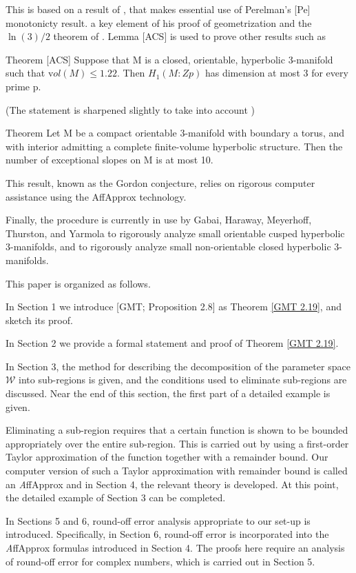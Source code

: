 This is based on a result of \cite{ADST},
that makes essential use of Perelman's [Pe] monotonicty result.
a key element of his proof of geometrization and the $\ln(3)/2$
theorem of \cite{GMT}.
Lemma [ACS] is used to prove other results such as 

Theorem [ACS] Suppose that M is a closed, orientable, hyperbolic
3-manifold such that ${\mathrm vol}(M) \le 1.22$.
Then $H_1(M:Zp)$ has dimension at most 3 for every prime p.

(The statement is sharpened slightly to take into account \cite{GT})

Theorem \cite{LM} Let M be a compact orientable 3-manifold with boundary a torus,
and with interior admitting a complete finite-volume hyperbolic structure.
Then the number of exceptional slopes on M is at most 10.

This result, known as the Gordon conjecture,
relies on rigorous computer assistance using the AffApprox technology.

Finally, the procedure is currently in use
by Gabai, Haraway, Meyerhoff, Thurston, and Yarmola
to rigorously analyze small orientable cusped hyperbolic $3$-manifolds,
and to rigorously analyze small non-orientable closed hyperbolic $3$-manifolds.


This paper is organized as follows.

In Section 1 we introduce [GMT; Proposition 2.8] as Theorem \ref{GMT 2.19},
and sketch its proof.

In Section 2 we provide a formal statement and proof of Theorem \ref{GMT 2.19}.

In Section 3,
the method for describing the decomposition
of the parameter space ${\mathcal W}$ into sub-regions is given,
and the conditions used to eliminate sub-regions are discussed.
Near the end of this section, the first part of a detailed example is given.

Eliminating 
a sub-region requires that a certain function is shown to be bounded 
appropriately over the entire sub-region.  This is carried out by using a 
first-order Taylor approximation of the function together with a 
remainder 
bound.
Our computer version of such a Taylor approximation with remainder bound 
is called an {\textit AffApprox} and in Section 4,
the relevant theory is developed.
At this point, the detailed example of Section 3 can be completed.

In Sections 5 and 6, round-off error analysis appropriate to our 
set-up is introduced.  Specifically, in Section 6, round-off error is 
incorporated 
into the {\textit AffApprox} formulas introduced in Section 4.  The proofs here 
require an analysis of round-off error for complex numbers, which is carried 
out in Section 5.


